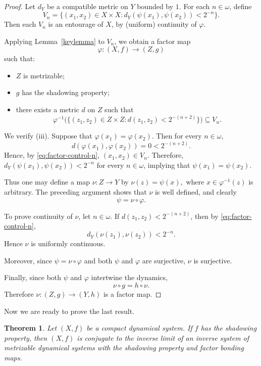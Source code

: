\documentclass[10pt,a4paper]{amsart}
\newtheorem{theorem}{Theorem}[section]
\numberwithin{equation}{section}
\begin{document}
\begin{proof}
Let $d_Y$ be a compatible metric on $Y$ bounded by $1$. 
For each $n\in \omega$, define
\[
V_n=\{(x_1,x_2)\in X\times X:
d_Y(\psi(x_1),\psi(x_2))<2^{-n}\}.
\]
Then each $V_n$ is an entourage of $X$, by (uniform) continuity of $\varphi$.

Applying Lemma~\ref{keylemma} to $V_n$, we obtain a factor map
\[
\varphi:(X,f)\to (Z,g)
\]
such that:
\begin{itemize}
\item $Z$ is metrizable;
\item $g$ has the shadowing property;
\item there exists a metric $d$ on $Z$ such that
\begin{equation}\label{eq:factor-control-n}
\varphi^{-1}\bigl(\{(z_1,z_2)\in Z\times Z:
d(z_1,z_2)<2^{-(n+2)}\}\bigr)
\subseteq V_n.
\end{equation}
\end{itemize}

We verify (iii). 
Suppose that $\varphi(x_1)=\varphi(x_2)$. 
Then for every $n\in \omega$,
\[
d(\varphi(x_1),\varphi(x_2))=0<2^{-(n+2)}.
\]
Hence, by \eqref{eq:factor-control-n},
$
(x_1,x_2)\in V_n.
$
Therefore,
$
d_Y(\psi(x_1),\psi(x_2))<2^{-n}
$
for every $n\in \omega$, implying that
$
\psi(x_1)=\psi(x_2).
$

Thus one may define a map $\nu:Z\to Y$ by
$
\nu(z)=\psi(x),
$
where $x\in \varphi^{-1}(z)$ is arbitrary. 
The preceding argument shows that $\nu$ is well defined, and clearly
\[
\psi=\nu\circ \varphi.
\]

To prove continuity of $\nu$, let $n\in \omega$. 
If $d(z_1,z_2)<2^{-(n+2)}$, then by \eqref{eq:factor-control-n},
\[
d_Y(\nu(z_1),\nu(z_2))<2^{-n}.
\]
Hence $\nu$ is uniformly continuous.

Moreover, since
$
\psi=\nu\circ\varphi
$
and both $\psi$ and $\varphi$ are surjective, $\nu$ is surjective.

Finally, since both $\psi$ and $\varphi$ intertwine the dynamics,
\[
\nu\circ g=h\circ \nu.
\]
Therefore $\nu:(Z,g)\to (Y,h)$ is a factor map.
\end{proof}






Now we are ready to prove the last result.
\begin{theorem}\label{ThC}
Let $(X,f)$ be a compact dynamical system. 
If $f$ has the shadowing property, then $(X,f)$ is conjugate to the inverse limit of an inverse system of metrizable dynamical systems with the shadowing property and factor bonding maps.
\end{theorem}
\end{document}
